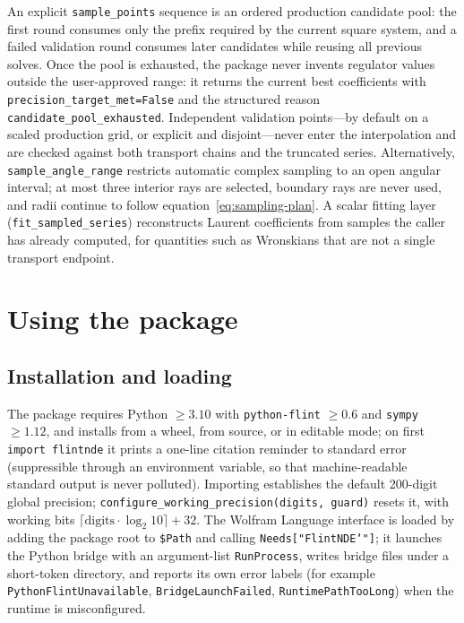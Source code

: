 \documentclass[11pt,a4paper]{article}
\begin{document}
An explicit \texttt{sample\_points} sequence is an ordered production candidate pool: the
first round consumes only the prefix required by the current square system, and a failed
validation round consumes later candidates while reusing all previous solves. Once the
pool is exhausted, the package never invents regulator values outside the user-approved
range: it returns the current best coefficients with
\texttt{precision\_target\_met=False} and the structured reason
\texttt{candidate\_pool\_exhausted}. Independent validation points---by default on a
scaled production grid, or explicit and disjoint---never enter the interpolation and are
checked against both transport chains and the truncated series. Alternatively,
\texttt{sample\_angle\_range} restricts automatic complex sampling to an open angular
interval; at most three interior rays are selected, boundary rays are never used, and
radii continue to follow equation~\eqref{eq:sampling-plan}. A scalar fitting layer
(\texttt{fit\_sampled\_series}) reconstructs Laurent coefficients from samples the caller
has already computed, for quantities such as Wronskians that are not a single transport
endpoint.

\section{Using the package}
\label{sec:usage}

\subsection{Installation and loading}
\label{sec:installation}

The package requires Python $\ge3.10$ with \texttt{python-flint} $\ge0.6$ and
\texttt{sympy} $\ge1.12$, and installs from a wheel, from source, or in editable mode; on
first \texttt{import flintnde} it prints a one-line citation reminder to standard error
(suppressible through an environment variable, so that machine-readable standard output is
never polluted). Importing establishes the default 200-digit global precision;
\texttt{configure\_working\_precision(digits, guard)} resets it, with working bits
$\lceil \mathrm{digits}\cdot\log_2 10\rceil+32$. The Wolfram Language interface is loaded
by adding the package root to \texttt{\$Path} and calling \texttt{Needs["FlintNDE`"]}; it
launches the Python bridge with an argument-list \texttt{RunProcess}, writes bridge files
under a short-token directory, and reports its own error labels (for example
\texttt{PythonFlintUnavailable}, \texttt{BridgeLaunchFailed},
\texttt{RuntimePathTooLong}) when the runtime is misconfigured.
\end{document}
